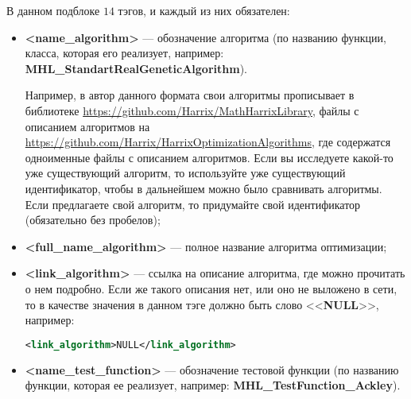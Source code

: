 \documentclass[a4paper,12pt]{article}
\begin{document}
В данном подблоке $ 14 $ тэгов, и каждый из них обязателен:
\begin{itemize}
\item \textbf{<name\_algorithm>} --- обозначение алгоритма (по названию функции, класса, которая его реализует, например: \textbf{MHL\_StandartRealGeneticAlgorithm}). 

Например, в автор данного формата свои алгоритмы прописывает в библиотеке \href {https://github.com/Harrix/MathHarrixLibrary} {https://github.com/Harrix/MathHarrixLibrary}, файлы с описанием алгоритмов на \href {https://github.com/Harrix/HarrixOptimizationAlgorithms} {https://github.com/Harrix/HarrixOptimizationAlgorithms}, где содержатся одноименные файлы с описанием алгоритмов. Если вы исследуете какой-то уже существующий алгоритм, то используйте уже существующий идентификатор, чтобы в дальнейшем можно было сравнивать алгоритмы. Если предлагаете свой алгоритм, то придумайте свой идентификатор (обязательно без пробелов);
\item \textbf{<full\_name\_algorithm>} --- полное название алгоритма оптимизации;
\item \textbf{<link\_algorithm>} --- ссылка на описание алгоритма, где можно прочитать о нем подробно. Если же такого описания нет, или оно не выложено в сети, то в качестве значения в данном тэге должно быть слово <<\textbf{NULL}>>, например:
\begin{lstlisting}[label=Part08, language=xml ,caption=У алгоритма нет ссылки в файле Harrix Optimization Testing]
<link_algorithm>NULL</link_algorithm>
\end{lstlisting}
\item \textbf{<name\_test\_function>} --- обозначение  тестовой функции (по названию функции, которая ее реализует, например: \textbf{MHL\_TestFunction\_Ackley}). 


\end{itemize}
\end{document}
